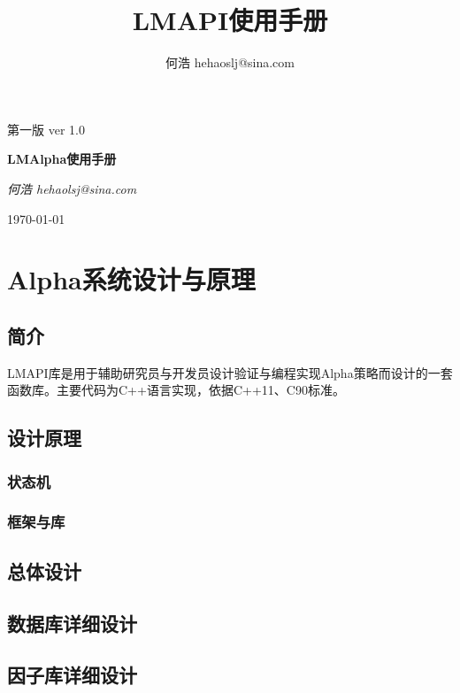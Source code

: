 \documentclass[10pt, a4paper]{book}
\title{LMAPI使用手册}
\author{何浩 hehaoslj@sina.com}
\begin{document}
\begin{titlepage}
{\large    第一版}
{\normalsize ver 1.0}


\begin{center}
{\Huge\bfseries
LMAlpha使用手册}

\bigskip
{\Large\itshape
何浩 hehaolsj@sina.com}

\medskip
\today
\end{center}
\end{titlepage}

\tableofcontents

\part[系统设计]{Alpha系统设计与原理}
\chapter{简介}

LMAPI库是用于辅助研究员与开发员设计验证与编程实现Alpha策略而设计的一套函数库。主要代码为C++语言实现，依据C++11、C90标准。
    \chapter{设计原理}
        \section{状态机}
        \section{框架与库}
    \chapter{总体设计}
    \chapter{数据库详细设计}
    \chapter{因子库详细设计}
\end{document}
